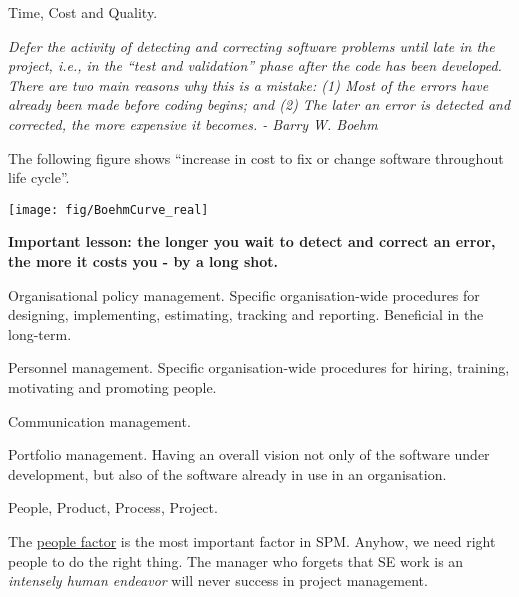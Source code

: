 \documentclass[landscape,30pt]{foils}
\begin{document}

Time, Cost and Quality.


{\em Defer the activity of detecting and correcting software problems
until late in the project, i.e., in the “test and validation” phase
after the code has been developed. There are two main reasons why
this is a mistake: (1) Most of the errors have already been made
before coding begins; and (2) The later an error is detected and
corrected, the more expensive it becomes.  - Barry W. Boehm}


The following figure shows ``increase in cost to fix or change software
throughout life cycle''.

\begin{center}
\texttt{[image: fig/BoehmCurve\_real]}
\end{center}

{\bf Important lesson: the longer you wait to detect and correct an error, the more it costs you - by a long shot.}




Organisational policy management. Specific organisation-wide procedures for designing, implementing, estimating, tracking and reporting.  Beneficial in the long-term.

Personnel management.   Specific organisation-wide procedures for hiring, training, motivating and promoting people.

Communication management.

Portfolio management.  Having an overall vision not only of the software under development, but also of the software already in use in an organisation.  




People, Product, Process, Project.


The \underline{people factor} is the most important factor in SPM.  Anyhow, we need right people to do the right thing.
The manager who forgets that SE work is an {\em intensely human endeavor} will never success in project management.
\end{document}
